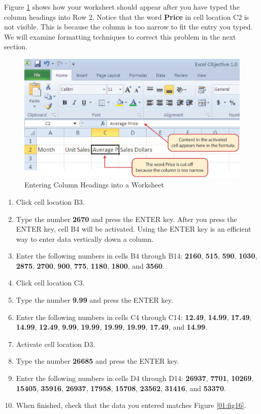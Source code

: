 Figure \ref{01:fig15} shows how your worksheet should appear after you have typed the column headings into Row 2. Notice that the word \textbf{Price} in cell location \textsf{C2} is not visible. This is because the column is too narrow to fit the entry you typed. We will examine formatting techniques to correct this problem in the next section.

\begin{figure}[H]
	\centering
	\includegraphics[width=\maxwidth{.95\linewidth}]{gfx/ch01_fig15}
	\caption{Entering Column Headings into a Worksheet}
	\label{01:fig15}
\end{figure}

\begin{enumerate}
	\item Click cell location \textsf{B3}.
	\item Type the number \textbf{2670} and press the ENTER key. After you press the ENTER key, cell \textsf{B4} will be activated. Using the ENTER key is an efficient way to enter data vertically down a column.
	\item Enter the following numbers in cells \textsf{B4} through \textsf{B14}: \textbf{2160}, \textbf{515}, \textbf{590}, \textbf{1030}, \textbf{2875}, \textbf{2700}, \textbf{900}, \textbf{775}, \textbf{1180}, \textbf{1800}, and \textbf{3560}.
	\item Click cell location \textsf{C3}.
	\item Type the number \textbf{9.99} and press the ENTER key.
	\item Enter the following numbers in cells \textsf{C4} through \textsf{C14}: \textbf{12.49}, \textbf{14.99}, \textbf{17.49}, \textbf{14.99}, \textbf{12.49}, \textbf{9.99}, \textbf{19.99}, \textbf{19.99}, \textbf{19.99}, \textbf{17.49}, and \textbf{14.99}.
	\item Activate cell location \textsf{D3}.
	\item Type the number \textbf{26685} and press the ENTER key.
	\item Enter the following numbers in cells \textsf{D4} through \textsf{D14}: \textbf{26937}, \textbf{7701}, \textbf{10269}, \textbf{15405}, \textbf{35916}, \textbf{26937}, \textbf{17958}, \textbf{15708}, \textbf{23562}, \textbf{31416}, and \textbf{53370}.
	\item When finished, check that the data you entered matches Figure \ref{01:fig16}.
\end{enumerate}

